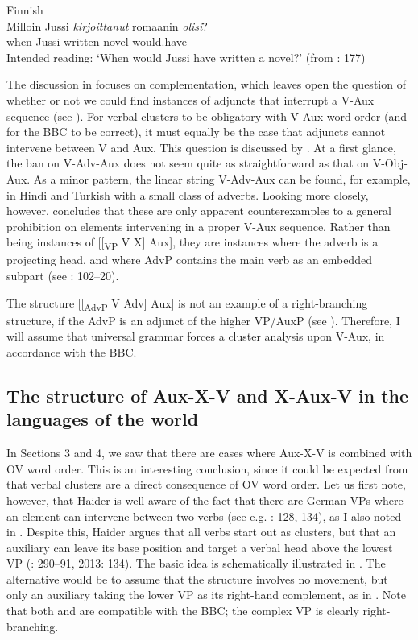 \documentclass[output=paper, colorlinks, citecolor=brown]{langscibook}
\begin{document}
\ex Finnish\label{ex:sangfelt:29b}\\
\gll * Milloin Jussi \textit{kirjoittanut} {romaanin} \textit{olisi}? \\
 {} when Jussi written novel would.have\\
\glt Intended reading: ‘When would Jussi have written a novel?’ (from \citealt{BiberauerEtAl2014}: 177)\\
\z 
\z 


The discussion in \citet{BiberauerEtAl2014} focuses on complementation, which leaves open the question of whether or not we could find instances of adjuncts that interrupt a V-Aux sequence (see ). For verbal clusters to be obligatory with V-Aux word order (and for the BBC to be correct), it must equally be the case that adjuncts cannot intervene between V and Aux. This question is discussed by \citet{Sheehan2017Final}. At a first glance, the ban on V-Adv-Aux does not seem quite as straightforward as that on V-Obj-Aux. As a minor pattern, the linear string V-Adv-Aux can be found, for example, in Hindi and Turkish with a small class of adverbs. Looking more closely, however, \citet{Sheehan2017Final} concludes that these are only apparent counterexamples to a general prohibition on elements intervening in a proper V-Aux sequence. Rather than being instances of [[\textsubscript{VP} V X] Aux], they are instances where the adverb is a projecting head, and where AdvP contains the main verb as an embedded subpart (see \citealt{Sheehan2017Final}: 102–20).


The structure [[\textsubscript{AdvP} V Adv] Aux] is not an example of a right-branching structure, if the AdvP is an adjunct of the higher VP/AuxP (see \citealt{Haider2013}). Therefore, I will assume that universal grammar forces a cluster analysis upon V-Aux, in accordance with the BBC. 


\subsection{The structure of Aux-X-V and X-Aux-V in the languages of the world}\label{sec:sangfelt:5.2}

In Sections 3 and 4, we saw that there are cases where Aux-X-V is combined with OV word order. This is an interesting conclusion, since it could be expected from \citet{Haider2010} that verbal clusters are a direct consequence of OV word order. Let us first note, however, that Haider is well aware of the fact that there are German VPs where an element can intervene between two verbs (see e.g. \citealt{Haider2013}: 128, 134), as I also noted in . Despite this, Haider argues that all verbs start out as clusters, but that an auxiliary can leave its base position and target a verbal head above the lowest VP (\citealt{Haider2010}: 290–91, 2013: 134). The basic idea is schematically illustrated in . The alternative would be to assume that the structure involves no movement, but only an auxiliary taking the lower VP as its right-hand complement, as in . Note that both  and  are compatible with the BBC; the complex VP is clearly right-branching.
\end{document}
